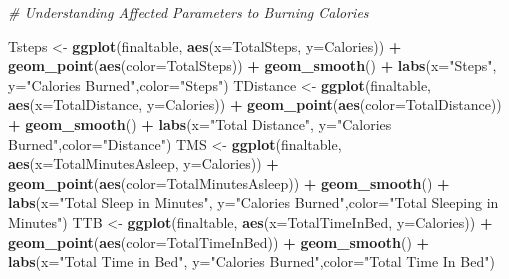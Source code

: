 \documentclass[
]{article}
\newenvironment{Shaded}{\begin{snugshade}}{\end{snugshade}}
\newcommand{\AttributeTok}[1]{\textcolor[rgb]{0.13,0.29,0.53}{#1}}
\newcommand{\CommentTok}[1]{\textcolor[rgb]{0.56,0.35,0.01}{\textit{#1}}}
\newcommand{\FunctionTok}[1]{\textcolor[rgb]{0.13,0.29,0.53}{\textbf{#1}}}
\newcommand{\NormalTok}[1]{#1}
\newcommand{\OtherTok}[1]{\textcolor[rgb]{0.56,0.35,0.01}{#1}}
\newcommand{\SpecialCharTok}[1]{\textcolor[rgb]{0.81,0.36,0.00}{\textbf{#1}}}
\newcommand{\StringTok}[1]{\textcolor[rgb]{0.31,0.60,0.02}{#1}}
\begin{document}
\begin{Shaded}
\begin{Highlighting}[]
\CommentTok{\# Understanding Affected Parameters to Burning Calories}

\NormalTok{Tsteps }\OtherTok{\textless{}{-}} \FunctionTok{ggplot}\NormalTok{(finaltable, }\FunctionTok{aes}\NormalTok{(}\AttributeTok{x=}\NormalTok{TotalSteps, }\AttributeTok{y=}\NormalTok{Calories)) }\SpecialCharTok{+} \FunctionTok{geom\_point}\NormalTok{(}\FunctionTok{aes}\NormalTok{(}\AttributeTok{color=}\NormalTok{TotalSteps)) }\SpecialCharTok{+} \FunctionTok{geom\_smooth}\NormalTok{() }\SpecialCharTok{+} \FunctionTok{labs}\NormalTok{(}\AttributeTok{x=}\StringTok{"Steps"}\NormalTok{, }\AttributeTok{y=}\StringTok{"Calories Burned"}\NormalTok{,}\AttributeTok{color=}\StringTok{"Steps"}\NormalTok{)}
\NormalTok{TDistance }\OtherTok{\textless{}{-}} \FunctionTok{ggplot}\NormalTok{(finaltable, }\FunctionTok{aes}\NormalTok{(}\AttributeTok{x=}\NormalTok{TotalDistance, }\AttributeTok{y=}\NormalTok{Calories)) }\SpecialCharTok{+} \FunctionTok{geom\_point}\NormalTok{(}\FunctionTok{aes}\NormalTok{(}\AttributeTok{color=}\NormalTok{TotalDistance)) }\SpecialCharTok{+} \FunctionTok{geom\_smooth}\NormalTok{() }\SpecialCharTok{+} \FunctionTok{labs}\NormalTok{(}\AttributeTok{x=}\StringTok{"Total Distance"}\NormalTok{, }\AttributeTok{y=}\StringTok{"Calories Burned"}\NormalTok{,}\AttributeTok{color=}\StringTok{"Distance"}\NormalTok{)}
\NormalTok{TMS }\OtherTok{\textless{}{-}} \FunctionTok{ggplot}\NormalTok{(finaltable, }\FunctionTok{aes}\NormalTok{(}\AttributeTok{x=}\NormalTok{TotalMinutesAsleep, }\AttributeTok{y=}\NormalTok{Calories)) }\SpecialCharTok{+} \FunctionTok{geom\_point}\NormalTok{(}\FunctionTok{aes}\NormalTok{(}\AttributeTok{color=}\NormalTok{TotalMinutesAsleep)) }\SpecialCharTok{+} \FunctionTok{geom\_smooth}\NormalTok{() }\SpecialCharTok{+} \FunctionTok{labs}\NormalTok{(}\AttributeTok{x=}\StringTok{"Total Sleep in Minutes"}\NormalTok{, }\AttributeTok{y=}\StringTok{"Calories Burned"}\NormalTok{,}\AttributeTok{color=}\StringTok{"Total Sleeping in Minutes"}\NormalTok{)}
\NormalTok{TTB }\OtherTok{\textless{}{-}} \FunctionTok{ggplot}\NormalTok{(finaltable, }\FunctionTok{aes}\NormalTok{(}\AttributeTok{x=}\NormalTok{TotalTimeInBed, }\AttributeTok{y=}\NormalTok{Calories)) }\SpecialCharTok{+} \FunctionTok{geom\_point}\NormalTok{(}\FunctionTok{aes}\NormalTok{(}\AttributeTok{color=}\NormalTok{TotalTimeInBed)) }\SpecialCharTok{+} \FunctionTok{geom\_smooth}\NormalTok{() }\SpecialCharTok{+} \FunctionTok{labs}\NormalTok{(}\AttributeTok{x=}\StringTok{"Total Time in Bed"}\NormalTok{, }\AttributeTok{y=}\StringTok{"Calories Burned"}\NormalTok{,}\AttributeTok{color=}\StringTok{"Total Time In Bed"}\NormalTok{)}

\end{Highlighting}
\end{Shaded}
\end{document}
